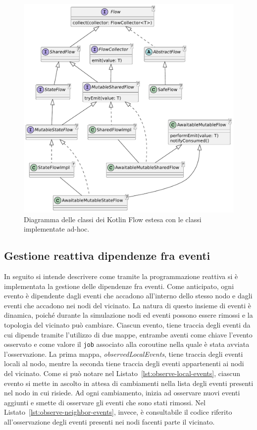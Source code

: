 \documentclass[12pt,a4paper,openright,twoside]{book}
\begin{document}
\begin{figure}
    \centering
    \includegraphics[width=\linewidth]{figures/implementation/extended-flow.pdf}
    \caption{Diagramma delle classi dei Kotlin Flow estesa con le classi implementate ad-hoc.}
    \label{fig:extended-flow}
\end{figure}



\subsection{Gestione reattiva dipendenze fra eventi}
In seguito si intende descrivere come tramite la programmazione reattiva si è implementata la gestione delle dipendenze fra eventi. 
Come anticipato, ogni evento è dipendente dagli eventi che accadono all'interno dello stesso nodo e dagli eventi che accadono nei nodi del vicinato. La natura di questo insieme di eventi è dinamica, poiché durante la simulazione nodi ed eventi possono essere rimossi e la topologia del vicinato può cambiare. 
Ciascun evento, tiene traccia degli eventi da cui dipende tramite l'utilizzo di due mappe, entrambe aventi come chiave l'evento osservato e come valore il \texttt{job} associato alla coroutine nella quale è stata avviata l'osservazione. La prima mappa, \textit{observedLocalEvents}, tiene traccia degli eventi locali al nodo, mentre la seconda tiene traccia degli eventi appartenenti ai nodi del vicinato. 
Come si può notare nel Listato~\ref{lst:observe-local-events}, ciascun evento si mette in ascolto in attesa di cambiamenti nella lista degli eventi presenti nel nodo in cui risiede. Ad ogni cambiamento, inizia ad osservare nuovi eventi aggiunti e smette di osservare gli eventi che sono stati rimossi. 
Nel Listato~\ref{lst:observe-neighbor-events}, invece, è consultabile il codice riferito all'osservazione degli eventi presenti nei nodi facenti parte il vicinato.
\end{document}
